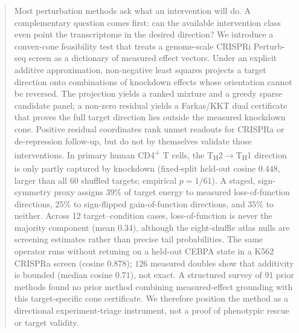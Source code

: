 \begin{abstract}
Most perturbation methods ask what an intervention will do. A complementary question comes
first: can the available intervention class even point the transcriptome in the desired
direction? We introduce a convex-cone feasibility test that treats a genome-scale CRISPRi
Perturb-seq screen as a dictionary of measured effect vectors. Under an explicit additive
approximation, non-negative least squares projects a target direction onto combinations of
knockdown effects whose orientation cannot be reversed. The projection yields a ranked
mixture and a greedy sparse candidate panel; a non-zero residual yields a Farkas/KKT dual
certificate that proves the full target direction lies outside the measured knockdown cone.
Positive residual coordinates rank unmet readouts for CRISPRa or de-repression follow-up, but
do not by themselves validate those interventions. In primary human
CD4\textsuperscript{+} T cells, the T\textsubscript{H}2$\rightarrow$T\textsubscript{H}1
direction is only partly captured by knockdown (fixed-split held-out cosine $0.448$, larger
than all $60$ shuffled targets; empirical $p=1/61$). A staged, sign-symmetry proxy assigns
$39\%$ of target energy to measured loss-of-function directions, $25\%$ to sign-flipped
gain-of-function directions, and $35\%$ to neither. Across 12 target--condition cases,
loss-of-function is never the majority component (mean $0.34$), although the eight-shuffle
atlas nulls are screening estimates rather than precise tail probabilities. The same operator
runs without retuning on a held-out CEBPA state in a K562 CRISPRa screen (cosine $0.878$);
$126$ measured doubles show that additivity is bounded (median cosine $0.71$), not exact. A
structured survey of $91$ prior methods found no prior method combining measured-effect
grounding with this target-specific cone certificate. We therefore position the method as a
directional experiment-triage instrument, not a proof of phenotypic rescue or target validity.
\end{abstract}
